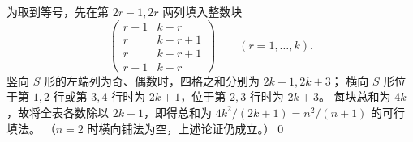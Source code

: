 \documentclass[UTF8,11pt,fontset=fandol]{ctexart}
\numberwithin{equation}{section}
\newcommand{\qedmark}{\qed\par}
\begin{document}
为取到等号，先在第 $2r-1,2r$ 两列填入整数块
\[
 \begin{pmatrix}
 r-1&k-r\\
 r&k-r+1\\
 r&k-r+1\\
 r-1&k-r
 \end{pmatrix}
 \qquad(r=1,\ldots,k).
\]
竖向 $S$ 形的左端列为奇、偶数时，四格之和分别为 $2k+1,2k+3$；
横向 $S$ 形位于第 $1,2$ 行或第 $3,4$ 行时为 $2k+1$，位于第 $2,3$ 行时为 $2k+3$。
每块总和为 $4k$，故将全表各数除以 $2k+1$，即得总和为
$4k^2/(2k+1)=n^2/(n+1)$ 的可行填法。
（$n=2$ 时横向铺法为空，上述论证仍成立。）\qedmark
\end{document}
